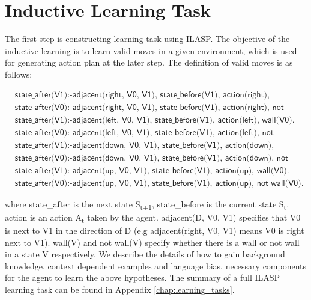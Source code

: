 \section{Inductive Learning Task}
\label{sec:inductive_learning_task}
The first step is constructing learning task using ILASP. The objective of the inductive learning is to learn valid moves in a given environment, which is used for generating action plan at the later step.
The definition of valid moves is as follows:

\begin{equation}
\begin{split}
&\textsf{state\_after(V1):-adjacent(right, V0, V1), state\_before(V1), action(right), wall(V0).}\\
&\textsf{state\_after(V0):-adjacent(right, V0, V1), state\_before(V1), action(right), not wall(V0).}\\
&\textsf{state\_after(V1):-adjacent(left, V0, V1), state\_before(V1), action(left), wall(V0).}\\
&\textsf{state\_after(V0):-adjacent(left, V0, V1), state\_before(V1), action(left), not wall(V0).}\\
&\textsf{state\_after(V1):-adjacent(down, V0, V1), state\_before(V1), action(down), wall(V0).}\\
&\textsf{state\_after(V0):-adjacent(down, V0, V1), state\_before(V1), action(down), not wall(V0).}\\
&\textsf{state\_after(V1):-adjacent(up, V0, V1), state\_before(V1),  action(up), wall(V0).}\\
&\textsf{state\_after(V0):-adjacent(up, V0, V1), state\_before(V1), action(up), not wall(V0).}
\end{split}
\label{target_hypothesis}
\end{equation}

where \textsf{state\_after} is the next state S\textsubscript{t+1}, \textsf{state\_before} is the current state S\textsubscript{t}. \textsf{action} is an action A\textsubscript{t} taken by the agent.
\textsf{adjacent(D, V0, V1)} specifies that V0 is next to V1 in the direction of D (e.g \textsf{adjacent(right, V0, V1)} means V0 is right next to V1). 
\textsf{wall(V)} and \textsf{not wall(V)} specify whether there is a wall or not wall in a state V respectively.
We describe the details of how to gain background knowledge, context dependent examples and language bias, necessary components for the agent to learn the above hypotheses.
The summary of a full ILASP learning task can be found in Appendix \ref{chap:learning_tasks}.

